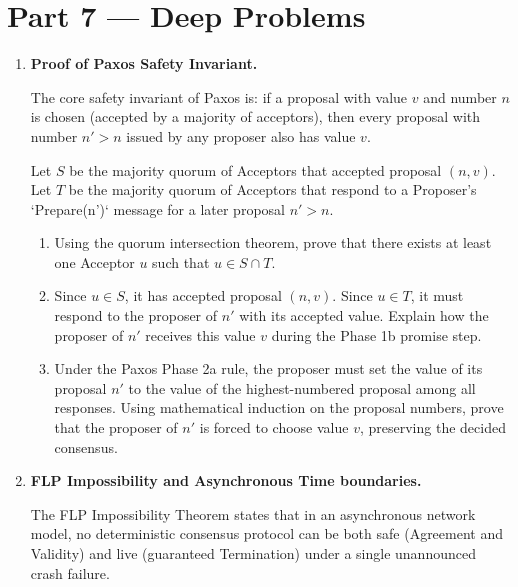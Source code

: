 \documentclass[12pt, a4paper]{book}
\begin{document}
\section{Part 7 --- Deep Problems}

\begin{deepbox}
\begin{enumerate}[label=\textbf{D\arabic*.}]
  \item \textbf{Proof of Paxos Safety Invariant.}
  
        The core safety invariant of Paxos is: if a proposal with value $v$ and number $n$ is chosen (accepted by a majority of acceptors), then every proposal with number $n' > n$ issued by any proposer also has value $v$.
        
        Let $S$ be the majority quorum of Acceptors that accepted proposal $(n, v)$.
        Let $T$ be the majority quorum of Acceptors that respond to a Proposer's `Prepare(n')` message for a later proposal $n' > n$.
        
        \begin{enumerate}[label=(\alph*)]
          \item Using the quorum intersection theorem, prove that there exists at least one Acceptor $u$ such that $u \in S \cap T$.
          \item Since $u \in S$, it has accepted proposal $(n, v)$.
                Since $u \in T$, it must respond to the proposer of $n'$ with its accepted value.
                Explain how the proposer of $n'$ receives this value $v$ during the Phase 1b promise step.
          \item Under the Paxos Phase 2a rule, the proposer must set the value of its proposal $n'$ to the value of the highest-numbered proposal among all responses.
                Using mathematical induction on the proposal numbers, prove that the proposer of $n'$ is forced to choose value $v$, preserving the decided consensus.
        \end{enumerate}

  \item \textbf{FLP Impossibility and Asynchronous Time boundaries.}
  
        The FLP Impossibility Theorem states that in an asynchronous network model, no deterministic consensus protocol can be both safe (Agreement and Validity) and live (guaranteed Termination) under a single unannounced crash failure.
        

\end{enumerate}
\end{deepbox}
\end{document}
